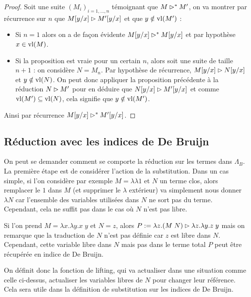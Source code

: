 \begin{proof}
    Soit une suite $(M_i)_{i=1,\ldots,n}$ témoignant que $M\rhd^* M'$, on va montrer par récurrence sur $n$ que $M[y/x]\rhd M'[y/x]$ et que $y\notin\mathrm{vl}(M')$ :
    \begin{itemize}[label=$\bullet$]
        \item Si $n = 1$ alors on a de façon évidente $M[y/x]\rhd^* M[y/x]$ et par hypothèse $x\in \mathrm{vl}(M)$.
        \item Si la proposition est vraie pour un certain $n$, alors soit une suite de taille $n+1$ : on considère $N = M_n$. Par hypothèse de récurrence, $M[y/x]\rhd N[y/x]$ et $y\notin\mathrm{vl}(N)$. On peut donc appliquer la proposition précédente à la réduction $N\rhd M'$ pour en déduire que $N[y/x]\rhd M'[y/x]$ et comme $\mathrm{vl}(M')\subseteq \mathrm{vl}(N)$, cela signifie que $y\notin\mathrm{vl}(M')$.
    \end{itemize}
    Ainsi par récurrence $M[y/x]\rhd^*M'[y/x]$.
\end{proof}

\subsection{Réduction avec les indices de De Bruijn}

On peut se demander comment se comporte la réduction sur les termes dans $\Lambda_B$. La première étape est de considérer l'action de la substitution. Dans un cas simple, si l'on considère par exemple $M = \lambda \lambda 1$ et $N$ un terme clos, alors remplacer le $1$ dans $M$ (et supprimer le $\lambda$ extérieur) va simplement nous donner $\lambda N$ car l'ensemble des variables utilisées dans $N$ ne \og sort\fg{} pas du terme. Cependant, cela ne suffit pas dans le cas où $N$ n'est pas libre.

\begin{expl}
    Si l'on prend $M = \lambda x.\lambda y. x\;y$ et $N = z$, alors $P :=\lambda z.(M\;N)\rhd \lambda z.\lambda y.z\;y$ mais on remarque que la traduction de $N$ n'est pas définie car $z$ est libre dans $N$. Cependant, cette variable libre dans $N$ mais pas dans le terme total $P$ peut être récupérée en indice de De Bruijn.
\end{expl}

On définit donc la fonction de lifting, qui va actualiser dans une situation comme celle ci-dessus, actualiser les variables libres de $N$ pour changer leur référence. Cela sera utile dans la définition de substitution sur les indices de De Bruijn.

